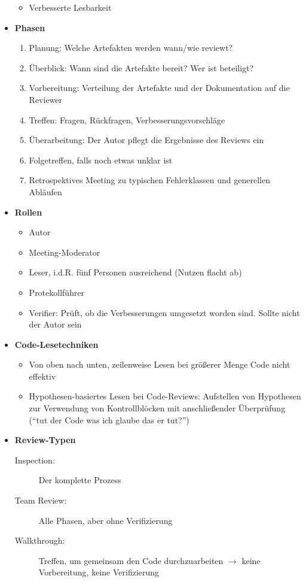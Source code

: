 \begin{itemize}
\begin{itemize}
		\item Verbesserte Lesbarkeit
	\end{itemize}
	\item \textbf{Phasen}
	\begin{enumerate}
		\item Planung: Welche Artefakten werden wann/wie reviewt?
		\item Überblick: Wann sind die Artefakte bereit? Wer ist beteiligt?
		\item Vorbereitung: Verteilung der Artefakte und der Dokumentation auf die Reviewer
		\item Treffen: Fragen, Rückfragen, Verbesserungsvorschläge
		\item Überarbeitung: Der Autor pflegt die Ergebnisse des Reviews ein
		\item Folgetreffen, falls noch etwas unklar ist
		\item Retrospektives Meeting zu typischen Fehlerklassen und generellen Abläufen
	\end{enumerate}
	\item \textbf{Rollen}
	\begin{itemize}
		\item Autor
		\item Meeting-Moderator
		\item Leser, i.d.R. fünf Personen ausreichend (Nutzen flacht ab)
		\item Protekollführer
		\item Verifier: Prüft, ob die Verbesserungen umgesetzt worden sind. Sollte nicht der Autor sein
	\end{itemize}
	\item \textbf{Code-Lesetechniken}
	\begin{itemize}
		\item Von oben nach unten, zeilenweise Lesen bei größerer Menge Code nicht effektiv
		\item Hypothesen-basiertes Lesen bei Code-Reviews: Aufstellen von Hypothesen zur Verwendung von Kontrollblöcken mit anschließender Überprüfung ("`tut der Code was ich glaube das er tut?"')
	\end{itemize}
	\item \textbf{Review-Typen}
	\begin{description}
		\item[Inspection:] Der komplette Prozess
		\item[Team Review:] Alle Phasen, aber ohne Verifizierung
		\item[Walkthrough:] Treffen, um gemeinsam den Code durchzuarbeiten \(\rightarrow\) keine Vorbereitung, keine Verifizierung

\end{description}
\end{itemize}
